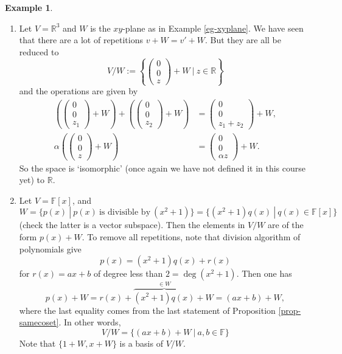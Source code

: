 \documentclass[11pt,openany]{book}
\theoremstyle{plain}
\theoremstyle{definition}
\newtheorem{example}[example]{Example}
\theoremstyle{remark}
\begin{document}
\begin{example} \
\begin{enumerate}
    \item Let $V = \mathbb{R}^3$ and $W$ is the $xy$-plane as in Example \ref{eg-xyplane}. We have seen that there are a lot of repetitions $v + W = v' + W$. But they are all be reduced to
    $$V/W := \left\{ \begin{pmatrix} 0 \\ 0 \\ z \end{pmatrix} + W\ \Bigg|\ z \in \mathbb{R}\right\}$$
    and the operations are given by 
    \begin{align*} 
    \left(\begin{pmatrix} 0 \\ 0 \\ z_1 \end{pmatrix} + W\right) + \left(\begin{pmatrix} 0 \\ 0 \\ z_2 \end{pmatrix} + W\right) &= \begin{pmatrix} 0 \\ 0 \\ z_1+z_2 \end{pmatrix} + W,\\ \alpha\left(\begin{pmatrix} 0 \\ 0 \\ z \end{pmatrix} + W\right) &= \begin{pmatrix} 0 \\ 0 \\ \alpha z \end{pmatrix} + W.
    \end{align*}
    So the space is `isomorphic' (once again we have not defined it in this course yet) to $\mathbb{R}$.

    \item     Let $V = \mathbb{F}[x]$, and $W = \{p(x)\ |\ p(x)\ \text{is divisible by}\ (x^2+1)\} = \{(x^2+1)q(x)\ |\ q(x) \in \mathbb{F}[x]\}$ (check the latter is a vector subspace). Then the elements in $V/W$ are of the form
    $p(x) + W$. To remove all repetitions, note that division algorithm of polynomials give
    $$p(x) = (x^2+1)q(x) + r(x)$$
    for $r(x) = ax+b$ of degree less than $2 = \deg(x^2+1)$. Then one has
    $$p(x) +W = r(x) + \overbrace{(x^2+1)q(x)}^{\in W} + W = (ax+b) + W,$$
    where the last equality comes from the last statement of Proposition \ref{prop-samecoset}. In other words,
    $$V/W = \{(ax+b) + W\ |\ a, b \in \mathbb{F}\}$$
    Note that $\{1 + W, x + W\}$ is a basis of $V/W$.


\end{enumerate}
\end{example}
\end{document}
